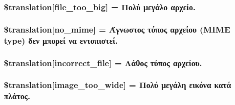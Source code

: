 \subsubsection[{\$translation}]{\setlength{\rightskip}{0pt plus 5cm}\$translation\mbox{[}\textquotesingle{}file\+\_\+too\+\_\+big\textquotesingle{}\mbox{]} = \textquotesingle{}Πολύ μεγάλο αρχείο.\textquotesingle{}}\label{class_8upload_8el___g_r_8php_a476278eb4a0c3df56af068e2d511a741}
\hypertarget{class_8upload_8el___g_r_8php_a191a55df8e3bb7f3c51b70f3c1932e02}{}
\subsubsection[{\$translation}]{\setlength{\rightskip}{0pt plus 5cm}\$translation\mbox{[}\textquotesingle{}no\+\_\+mime\textquotesingle{}\mbox{]} = \textquotesingle{}Άγνωστος τύπος αρχείου (M\+I\+M\+E type) δεν μπορεί να εντοπιστεί.\textquotesingle{}}\label{class_8upload_8el___g_r_8php_a191a55df8e3bb7f3c51b70f3c1932e02}
\hypertarget{class_8upload_8el___g_r_8php_a4d32343e2699edd6fd435f9c832cb9c7}{}
\subsubsection[{\$translation}]{\setlength{\rightskip}{0pt plus 5cm}\$translation\mbox{[}\textquotesingle{}incorrect\+\_\+file\textquotesingle{}\mbox{]} = \textquotesingle{}Λάθος τύπος αρχείου.\textquotesingle{}}\label{class_8upload_8el___g_r_8php_a4d32343e2699edd6fd435f9c832cb9c7}
\hypertarget{class_8upload_8el___g_r_8php_a0dd3e4930ca1f59ae280f4b1006525cd}{}
\subsubsection[{\$translation}]{\setlength{\rightskip}{0pt plus 5cm}\$translation\mbox{[}\textquotesingle{}image\+\_\+too\+\_\+wide\textquotesingle{}\mbox{]} = \textquotesingle{}Πολύ μεγάλη εικόνα κατά πλάτος.\textquotesingle{}}\label{class_8upload_8el___g_r_8php_a0dd3e4930ca1f59ae280f4b1006525cd}
\hypertarget{class_8upload_8el___g_r_8php_a5c9a4cd67fd21c32e0a3b434591a6037}{}
